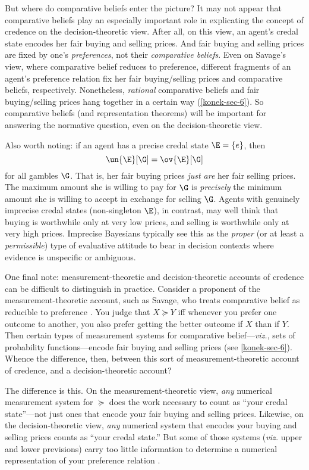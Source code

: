 But where do comparative beliefs enter the picture? It may not appear that comparative beliefs play an especially important role in explicating the concept of credence on the decision-theoretic view. After all, on this view, an agent's credal state encodes her fair buying and selling prices. And fair buying and selling prices are fixed by one's \textit{preferences}, not their \textit{comparative beliefs}. Even on Savage's view, where comparative belief reduces to preference, different fragments of an agent's preference relation fix her fair buying/selling prices and comparative beliefs, respectively. Nonetheless, \textit{rational} comparative beliefs and fair buying/selling prices hang together in a certain way (\autoref{konek-sec-6}). So comparative beliefs (and representation theorems) will be important for answering the normative question, even on the decision-theoretic view.

Also worth noting: if an agent has a precise credal state $\E=\left\{e\right\}$, then
$$ \un{\E}[\G]=\ov{\E}[\G] $$
for all gambles $\G$. That is, her fair buying prices \textit{just are} her fair selling prices. The maximum amount she is willing to pay for $\G$ is \textit{precisely} the minimum amount she is willing to accept in exchange for selling $\G$. Agents with genuinely imprecise credal states (non-singleton $\E$), in contrast, may well think that buying is worthwhile only at very low prices, and selling is worthwhile only at very high prices. Imprecise Bayesians typically see this as the \textit{proper} (or at least a \textit{permissible}) type of evaluative attitude to bear in decision contexts where evidence is unspecific or ambiguous.

One final note: measurement-theoretic and decision-theoretic accounts of credence can be difficult to distinguish in practice. Consider a proponent of the measurement-theoretic account, such as Savage, who treats comparative belief as reducible to preference \citep[Section 3.2]{Savage1954}. You judge that $X\succeq Y$ iff whenever you prefer one outcome to another, you also prefer getting the better outcome if $X$ than if $Y$. Then certain types of measurement systems for comparative belief---\textit{viz.}, sets of probability functions---encode fair buying and selling prices (see \autoref{konek-sec-6}). Whence the difference, then, between this sort of measurement-theoretic account of credence, and a decision-theoretic account? 


The difference is this. On the measurement-theoretic view, \textit{any} numerical measurement system for $\succeq$ does the work necessary to count as ``your credal state''---not just ones that encode your fair buying and selling prices. Likewise, on the decision-theoretic view, \textit{any} numerical system that encodes your buying and selling prices counts as ``your credal state.'' But some of those systems (\textit{viz.} upper and lower previsions) carry too little information to determine a numerical representation of your preference relation \citep[Section 6]{Walley2000}.

